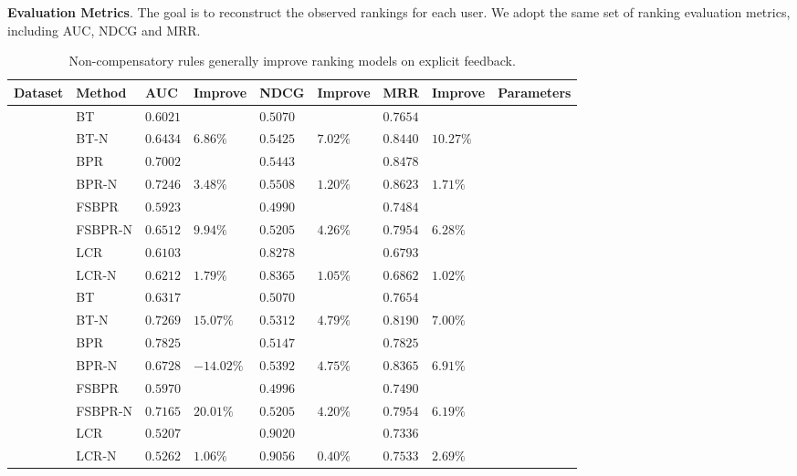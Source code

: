 \documentclass[letterpaper]{article} %
\begin{document}
\textbf{Evaluation Metrics}.  The goal is to reconstruct the observed rankings for each user. We adopt the same set of ranking evaluation metrics, including AUC, NDCG and MRR. 
\begin{table}[htp]
\tiny
\caption{Non-compensatory rules generally improve ranking models on explicit feedback.}
\begin{center}
\begin{tabular}{p{0.4cm}<{\centering}|p{1.4cm}<{\centering} |p{0.5cm} p{0.6cm} |p{0.5cm} p{0.6cm} |p{0.5cm} p{0.6cm}|c}
\hline
Dataset	& Method	& AUC	& Improve&	NDCG&	Improve&	MRR	&Improve & Parameters\\\hline
{} &	BT	& $0.6021$ 	& &	$0.5070$ 	&&	$0.7654$ 	& &\\
	&BT-N	&$0.6434$ &	$6.86\%$	&$0.5425 $	&$7.02\%$	&$0.8440$ &	$10.27\%$ &	\\
	&BPR&	$0.7002$ 	&&	$0.5443$ 	&&	$0.8478$ &&\\
	&BPR-N	&$0.7246$ 	&$3.48\%$	&$0.5508$ &	$1.20\%$	&$0.8623$ 	&$1.71\%$	&\\
	&FSBPR		&$0.5923$&	&$0.4990$ 	&&	$0.7484$&&\\	
	&FSBPR-N	&$0.6512$	&$9.94\%$	&	$0.5205$ 	&$4.26\%$	&$0.7954$ 	&$6.28\%$&	\\
	&LCR		&$0.6103$&	&$0.8278$ 	&&	$0.6793$&&\\	
	&LCR-N	&$0.6212$	&$1.79\%$	&	$0.8365$ 	&$1.05\%$	&$0.6862$ 	&$1.02\%$& \\

	\hline
{}	&	BT	& $0.6317 $ 	& &	$0.5070$ 	&&	$0.7654$ &	&\\
	&BT-N	&$0.7269$ &	$15.07\%$	&$0.5312 $	&$4.79\%$	&$0.8190$ &	$7.00\%$&\\
	&BPR&	$0.7825$ 	&&	$0.5147$ 	&&	$0.7825$ &&\\
	&BPR-N	&$0.6728$ 	&$-14.02\%$	&$0.5392$ &	$4.75\%$	&$0.8365$ 	&$6.91\%$	&\\
	&FSBPR		&$0.5970$&	&$0.4996$ 	&&	$0.7490$&&\\	
	&FSBPR-N	&$0.7165$	&$20.01\%$	&	$0.5205$ 	&$4.20\%$	&$0.7954$ 	&$6.19\%$	&\\
	&LCR		&$0.5207$&	&$0.9020$ 	&&	$0.7336$&&\\	
	&LCR-N	&$0.5262$	&$1.06\%$	&	$0.9056$ 	&$0.40\%$	&$0.7533$ 	&$2.69\%$& \\


\end{tabular}
\end{center}
\end{table}
\end{document}
